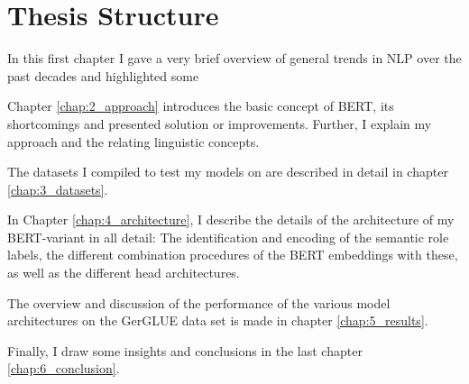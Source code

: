 \section{Thesis Structure}

In this first chapter I gave a very brief overview of general trends in
NLP over the past decades and highlighted some

Chapter \ref{chap:2_approach} introduces the basic concept of BERT,
its {\color{red} shortcomings} and presented solution or improvements. Further,
I explain my approach and the relating linguistic concepts.

The datasets I compiled to test my models on are described in detail
in chapter \ref{chap:3_datasets}.

In Chapter \ref{chap:4_architecture}, I describe the details of the architecture of
my BERT-variant in all detail: The identification and encoding of the semantic role
labels, the different combination procedures of the BERT embeddings with these, as
well as the different head architectures.

The overview and discussion of the performance of the various model architectures on
the GerGLUE data set is made in chapter \ref{chap:5_results}.

Finally, I draw some insights and conclusions in the last chapter \ref{chap:6_conclusion}.

